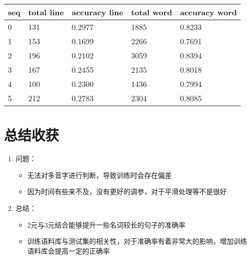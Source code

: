 \documentclass[]{article}
\begin{document}
\begin{center}
    \begin{tabular}{lllll}
    \hline
    seq & total line & accuracy line & total word & accuracy word \\ \hline
     0 & 131& 0.2977& 1885 & 0.8233\\ \hline 
     1 & 153& 0.1699& 2266 & 0.7691\\ \hline
     2 & 196& 0.2102& 3059 & 0.8394\\ \hline
     3 & 167& 0.2455& 2135 & 0.8018\\ \hline
     4 & 100& 0.2300& 1436 & 0.7994\\ \hline
     5 & 212& 0.2783& 2304 & 0.8085\\ \hline
    \end{tabular}
\end{center}

\section{总结收获}
\begin{enumerate}
    \item{问题：
        \begin{itemize}
            \item 无法对多音字进行判断，导致训练时会存在偏差
            \item 因为时间有些来不及，没有更好的调参，对于平滑处理等不是很好
        \end{itemize}    
    }
    \item{
        总结：
        \begin{itemize}
            \item 2元与3元结合能够提升一些名词较长的句子的准确率
            \item 训练语料库与测试集的相关性，对于准确率有着非常大的影响，增加训练语料库会提高一定的正确率
        \end{itemize}
    }
\end{enumerate}
\end{document}
